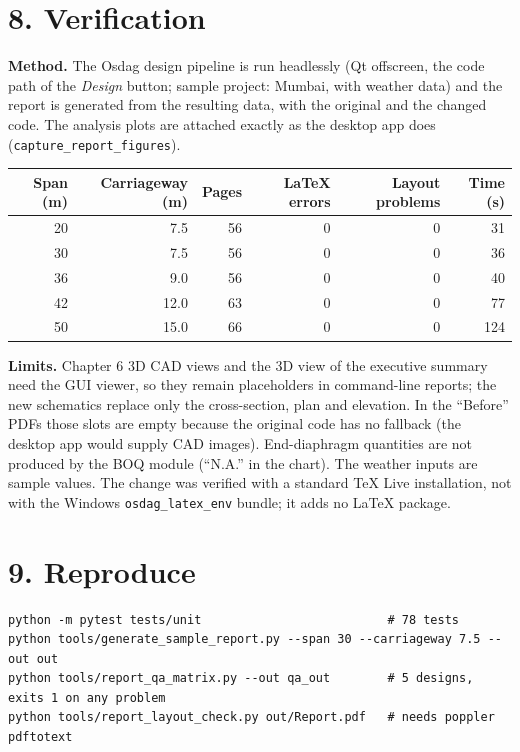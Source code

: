 \documentclass[11pt,a4paper]{article}
\begin{document}
\section*{8. Verification}
\textbf{Method.} The Osdag design pipeline is run headlessly (Qt offscreen, the code path of the \emph{Design}
button; sample project: Mumbai, with weather data) and the report is generated from the resulting data, with
the original and the changed code. The analysis plots are attached exactly as the desktop app does
(\verb|capture_report_figures|).

\begin{center}
\begin{tabular}{rrrrrr}
\toprule
Span (m) & Carriageway (m) & Pages & LaTeX errors & Layout problems & Time (s)\\
\midrule
20 & 7.5 & 56 & 0 & 0 & 31\\
30 & 7.5 & 56 & 0 & 0 & 36\\
36 & 9.0 & 56 & 0 & 0 & 40\\
42 & 12.0 & 63 & 0 & 0 & 77\\
50 & 15.0 & 66 & 0 & 0 & 124\\
\bottomrule
\end{tabular}
\end{center}

\textbf{Limits.} Chapter 6 3D CAD views and the 3D view of the executive summary need the GUI viewer, so they
remain placeholders in command-line reports; the new schematics replace only the cross-section, plan and
elevation. In the ``Before'' PDFs those slots are empty because the original code has no fallback (the
desktop app would supply CAD images). End-diaphragm quantities are not produced by the BOQ module (``N.A.''
in the chart). The weather inputs are sample values. The change was verified with a standard TeX Live
installation, not with the Windows \texttt{osdag\_latex\_env} bundle; it adds no LaTeX package.

\section*{9. Reproduce}
\begin{verbatim}
python -m pytest tests/unit                          # 78 tests
python tools/generate_sample_report.py --span 30 --carriageway 7.5 --out out
python tools/report_qa_matrix.py --out qa_out        # 5 designs, exits 1 on any problem
python tools/report_layout_check.py out/Report.pdf   # needs poppler pdftotext
\end{verbatim}
\end{document}
